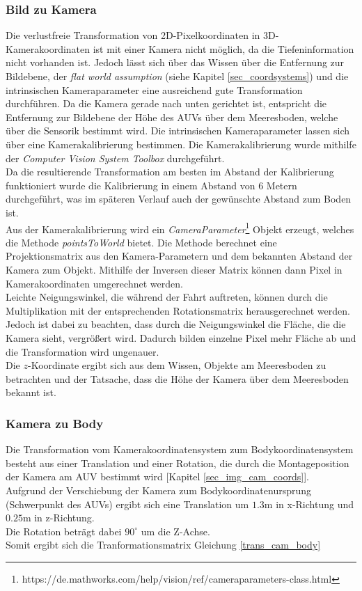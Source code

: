 \subsubsection{Bild zu Kamera}
\label{section_PicToCam}
Die verlustfreie Transformation von 2D-Pixelkoordinaten in 3D-Kamerakoordinaten ist mit einer Kamera nicht möglich, da die Tiefeninformation nicht vorhanden ist. Jedoch lässt sich über das Wissen über die Entfernung zur Bildebene, der \textit{flat world assumption} (siehe Kapitel \ref{sec_coordsystems}) und die intrinsischen Kameraparameter eine ausreichend gute Transformation durchführen. Da die Kamera gerade nach unten gerichtet ist, entspricht die Entfernung zur Bildebene der Höhe des AUVs über dem Meeresboden, welche über die Sensorik bestimmt wird. Die intrinsischen Kameraparameter lassen sich über eine Kamerakalibrierung bestimmen. Die Kamerakalibrierung wurde mithilfe der \matlab \textit{Computer Vision System Toolbox} durchgeführt.\\
Da die resultierende Transformation am besten im Abstand der Kalibrierung funktioniert wurde die Kalibrierung in einem Abstand von 6 Metern durchgeführt, was im späteren Verlauf auch der gewünschte Abstand zum Boden ist.\\
Aus der Kamerakalibrierung wird ein \textit{CameraParameter}\footnote{https://de.mathworks.com/help/vision/ref/cameraparameters-class.html} Objekt erzeugt, welches die Methode \textit{pointsToWorld} bietet. Die Methode berechnet eine Projektionsmatrix aus den Kamera-Parametern und dem bekannten Abstand der Kamera zum Objekt. Mithilfe der Inversen dieser Matrix können dann Pixel in Kamerakoordinaten umgerechnet werden.\\
Leichte Neigungswinkel, die während der Fahrt auftreten, können durch die Multiplikation mit der entsprechenden Rotationsmatrix herausgerechnet werden. Jedoch ist dabei zu beachten, dass durch die Neigungswinkel die Fläche, die die Kamera sieht, vergrößert wird. Dadurch bilden einzelne Pixel mehr Fläche ab und die Transformation wird ungenauer.\\
Die $z$-Koordinate ergibt sich aus dem Wissen, Objekte am Meeresboden zu betrachten und der Tatsache, dass die Höhe der Kamera über dem Meeresboden bekannt ist.

\subsubsection{Kamera zu Body}
Die Transformation vom Kamerakoordinatensystem zum Bodykoordinatensystem besteht aus einer Translation und einer Rotation, die durch die Montageposition der Kamera am AUV bestimmt wird [Kapitel \ref{sec_img_cam_coords}].\\
Aufgrund der Verschiebung der Kamera zum Bodykoordinatenursprung (Schwerpunkt des AUVs) ergibt sich eine Translation um $1.3$m in x-Richtung und $0.25$m in z-Richtung.\\
Die Rotation beträgt dabei $90^\circ$ um die Z-Achse.\\
Somit ergibt sich die Tranformationsmatrix Gleichung \ref{trans_cam_body}\\


